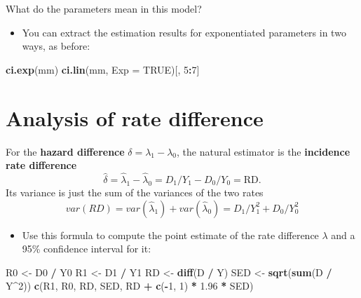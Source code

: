 \documentclass[
]{book}
\newenvironment{Shaded}{\begin{snugshade}}{\end{snugshade}}
\newcommand{\AttributeTok}[1]{\textcolor[rgb]{0.13,0.29,0.53}{#1}}
\newcommand{\ConstantTok}[1]{\textcolor[rgb]{0.56,0.35,0.01}{#1}}
\newcommand{\DecValTok}[1]{\textcolor[rgb]{0.00,0.00,0.81}{#1}}
\newcommand{\FloatTok}[1]{\textcolor[rgb]{0.00,0.00,0.81}{#1}}
\newcommand{\FunctionTok}[1]{\textcolor[rgb]{0.13,0.29,0.53}{\textbf{#1}}}
\newcommand{\NormalTok}[1]{#1}
\newcommand{\OtherTok}[1]{\textcolor[rgb]{0.56,0.35,0.01}{#1}}
\newcommand{\SpecialCharTok}[1]{\textcolor[rgb]{0.81,0.36,0.00}{\textbf{#1}}}
\providecommand{\tightlist}{%
  \setlength{\itemsep}{0pt}\setlength{\parskip}{0pt}}
\begin{document}
What do the parameters mean in this model?

\begin{itemize}
\tightlist
\item
  You can extract the estimation results for exponentiated parameters in two ways, as before:
\end{itemize}

\begin{Shaded}
\begin{Highlighting}[]
\FunctionTok{ci.exp}\NormalTok{(mm)}
\FunctionTok{ci.lin}\NormalTok{(mm, }\AttributeTok{Exp =} \ConstantTok{TRUE}\NormalTok{)[, }\DecValTok{5}\SpecialCharTok{:}\DecValTok{7}\NormalTok{]}
\end{Highlighting}
\end{Shaded}

\section{Analysis of rate difference}\label{analysis-of-rate-difference}

For the \textbf{hazard difference} \(\delta = \lambda_1 - \lambda_0\),
the natural estimator is the \textbf{incidence rate difference}
\[ \widehat\delta = \widehat\lambda_1  - \widehat\lambda_0 = D_1/Y_1 - D_0/Y_0 = \mbox{RD} . \]
Its variance is just the sum of the variances of the two rates
\[ var(RD) = var(\widehat\lambda_1 ) + var( \widehat\lambda_0 ) =  D_1/Y_1^2 + D_0/Y_0^2 \]

\begin{itemize}
\tightlist
\item
  Use this formula to compute the point estimate of the rate difference \(\lambda\) and a 95\% confidence interval for it:
\end{itemize}

\begin{Shaded}
\begin{Highlighting}[]
\NormalTok{R0 }\OtherTok{\textless{}{-}}\NormalTok{ D0 }\SpecialCharTok{/}\NormalTok{ Y0}
\NormalTok{R1 }\OtherTok{\textless{}{-}}\NormalTok{ D1 }\SpecialCharTok{/}\NormalTok{ Y1}
\NormalTok{RD }\OtherTok{\textless{}{-}} \FunctionTok{diff}\NormalTok{(D }\SpecialCharTok{/}\NormalTok{ Y)}
\NormalTok{SED }\OtherTok{\textless{}{-}} \FunctionTok{sqrt}\NormalTok{(}\FunctionTok{sum}\NormalTok{(D }\SpecialCharTok{/}\NormalTok{ Y}\SpecialCharTok{\^{}}\DecValTok{2}\NormalTok{))}
\FunctionTok{c}\NormalTok{(R1, R0, RD, SED, RD }\SpecialCharTok{+} \FunctionTok{c}\NormalTok{(}\SpecialCharTok{{-}}\DecValTok{1}\NormalTok{, }\DecValTok{1}\NormalTok{) }\SpecialCharTok{*} \FloatTok{1.96} \SpecialCharTok{*}\NormalTok{ SED)}
\end{Highlighting}
\end{Shaded}
\end{document}
